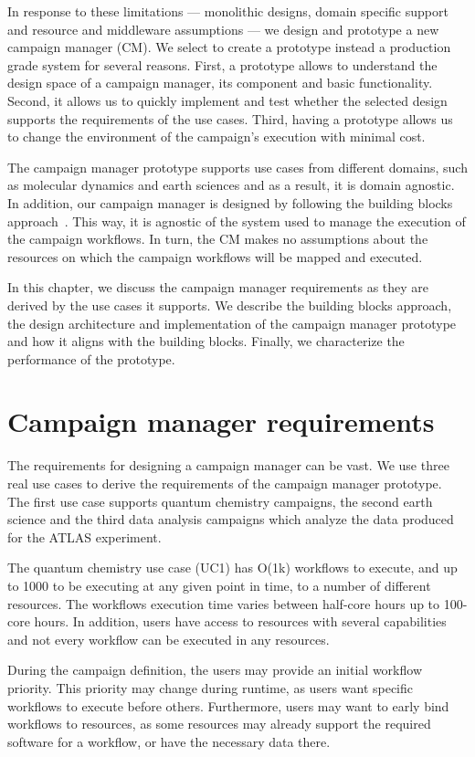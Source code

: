 In response to these limitations --- monolithic designs, domain specific support and resource and middleware assumptions --- we design and prototype a new campaign manager (CM).
We select to create a prototype instead a production grade system for several reasons.
First, a prototype allows to understand the design space of a campaign manager, its component and basic functionality.
Second, it allows us to quickly implement and test whether the selected design supports the requirements of the use cases.
Third, having a prototype allows us to change the environment of the campaign's execution with minimal cost.

The campaign manager prototype supports use cases from different domains, such as molecular dynamics and earth sciences and as a result, it is domain agnostic.
In addition, our campaign manager is designed by following the building blocks approach~\cite{turilli2019middleware}.
This way, it is agnostic of the system used to manage the execution of the campaign workflows.
In turn, the CM makes no assumptions about the resources on which the campaign workflows will be mapped and executed.

In this chapter, we discuss the campaign manager requirements as they are derived by the use cases it supports.
We describe the building blocks approach, the design architecture and implementation of the campaign manager prototype and how it aligns with the building blocks.
Finally, we characterize the performance  of the prototype.

\section{Campaign manager requirements}
The requirements for designing a campaign manager can be vast.
We use three real use cases to derive the requirements of the campaign manager prototype.
The first use case supports quantum chemistry campaigns, the second earth science and the third data analysis campaigns which analyze the data produced for the ATLAS experiment.

The quantum chemistry use case (UC1) has O(1k) workflows to execute, and up to 1000 to be executing at any given point in time, to a number of different resources. 
The workflows execution time varies between half-core hours up to 100-core hours.
In addition, users have access to resources with several capabilities and not every workflow can be executed in any resources. 

During the campaign definition, the users may provide an initial workflow priority.
This priority may change during runtime, as users want specific workflows to execute before others.
Furthermore, users may want to early bind workflows to resources, as some resources may already support the required software for a workflow, or have the necessary data there.

